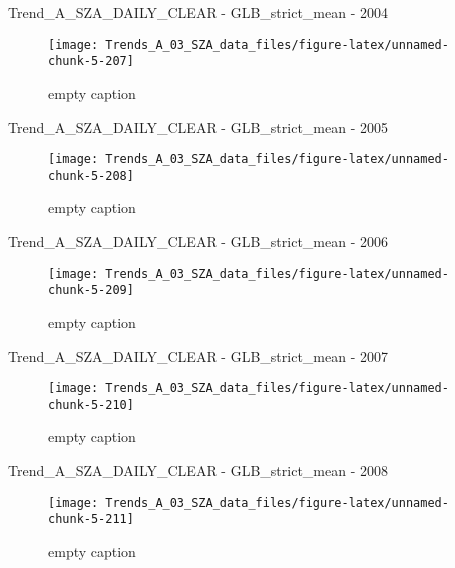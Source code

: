\documentclass[
  10pt,
  a4paper,oneside]{article}
\begin{document}
Trend\_A\_SZA\_DAILY\_CLEAR - GLB\_strict\_mean - 2004

\begin{figure}[!ht]

{\centering \texttt{[image: Trends\_A\_03\_SZA\_data\_files/figure-latex/unnamed-chunk-5-207]} 

}

\caption{ empty caption }\label{fig:unnamed-chunk-5-207}
\end{figure}

Trend\_A\_SZA\_DAILY\_CLEAR - GLB\_strict\_mean - 2005

\begin{figure}[!ht]

{\centering \texttt{[image: Trends\_A\_03\_SZA\_data\_files/figure-latex/unnamed-chunk-5-208]} 

}

\caption{ empty caption }\label{fig:unnamed-chunk-5-208}
\end{figure}

Trend\_A\_SZA\_DAILY\_CLEAR - GLB\_strict\_mean - 2006

\begin{figure}[!ht]

{\centering \texttt{[image: Trends\_A\_03\_SZA\_data\_files/figure-latex/unnamed-chunk-5-209]} 

}

\caption{ empty caption }\label{fig:unnamed-chunk-5-209}
\end{figure}

Trend\_A\_SZA\_DAILY\_CLEAR - GLB\_strict\_mean - 2007

\begin{figure}[!ht]

{\centering \texttt{[image: Trends\_A\_03\_SZA\_data\_files/figure-latex/unnamed-chunk-5-210]} 

}

\caption{ empty caption }\label{fig:unnamed-chunk-5-210}
\end{figure}

Trend\_A\_SZA\_DAILY\_CLEAR - GLB\_strict\_mean - 2008

\begin{figure}[!ht]

{\centering \texttt{[image: Trends\_A\_03\_SZA\_data\_files/figure-latex/unnamed-chunk-5-211]} 

}

\caption{ empty caption }\label{fig:unnamed-chunk-5-211}
\end{figure}
\end{document}
